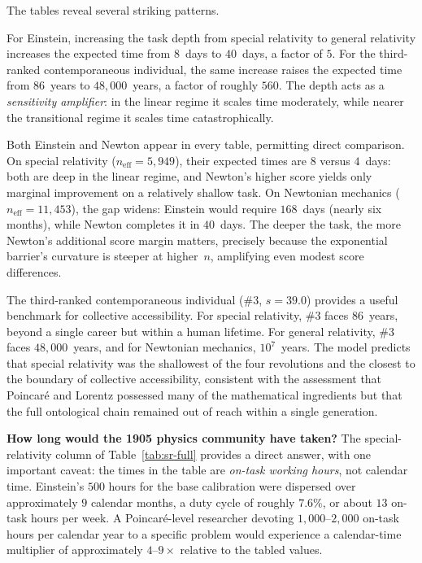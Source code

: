 \documentclass{article}
\begin{document}
The tables reveal several striking patterns.

For Einstein, increasing the task depth from special relativity to
general relativity increases the expected time from $8$~days to
$40$~days, a factor of $5$. For the third-ranked contemporaneous
individual, the same increase raises the expected time from $86$~years
to $48{,}000$~years, a factor of roughly $560$. The depth acts as a
\emph{sensitivity amplifier}: in the linear regime it scales time
moderately, while nearer the transitional regime it scales time
catastrophically.

Both Einstein and Newton appear in every table, permitting direct
comparison. On special relativity ($n_{\mathrm{eff}} = 5{,}949$), their
expected times are $8$ versus $4$~days: both are deep in the linear
regime, and Newton's higher score yields only marginal improvement on a
relatively shallow task. On Newtonian mechanics
($n_{\mathrm{eff}} = 11{,}453$), the gap widens: Einstein would require
$168$~days (nearly six months), while Newton completes it in $40$~days.
The deeper the task, the more Newton's additional score margin matters,
precisely because the exponential barrier's curvature is steeper at
higher~$n$, amplifying even modest score differences.

The third-ranked contemporaneous individual ($\#3$, $s = 39.0$) provides
a useful benchmark for collective accessibility. For special relativity,
$\#3$ faces $86$~years, beyond a single career but within a human
lifetime. For general relativity, $\#3$ faces $48{,}000$~years, and for
Newtonian mechanics, $10^7$~years. The model predicts that special
relativity was the shallowest of the four revolutions and the closest to
the boundary of collective accessibility, consistent with the assessment
that Poincar\'{e} and Lorentz possessed many of the mathematical
ingredients \cite{pais1982subtle} but that the full ontological chain
remained out of reach within a single generation.

\medskip
\noindent\textbf{How long would the 1905 physics community have taken?}\;
The special-relativity column of Table~\ref{tab:sr-full} provides a
direct answer, with one important caveat: the times in the table are
\emph{on-task working hours}, not calendar time. Einstein's $500$ hours
for the base calibration were dispersed over approximately $9$ calendar
months, a duty cycle of roughly $7.6\%$, or about $13$ on-task hours per
week. A Poincar\'{e}-level researcher devoting $1{,}000$--$2{,}000$
on-task hours per calendar year to a specific problem would experience a
calendar-time multiplier of approximately $4$--$9\times$ relative to
the tabled values.
\end{document}

